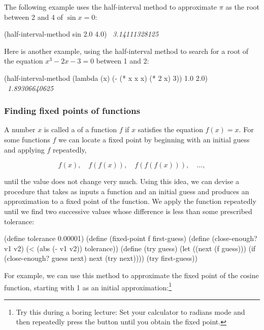 \noindent
The following example uses the half-interval method to approximate \( \pi \) as
the root between 2 and 4 of \( \sin x = 0 \):

\begin{codeBlock}
(half-interval-method sin 2.0 4.0)
~\textit{3.14111328125}~
\end{codeBlock}

\noindent
Here is another example, using the half-interval method to search for a root of
the equation \( x^3 - 2x - 3 = 0 \) between 1 and 2:

\begin{codeBlock}
(half-interval-method (lambda (x) (- (* x x x) (* 2 x) 3))
                      1.0
                      2.0)
~\textit{1.89306640625}~
\end{codeBlock}

\subsubsection*{Finding fixed points of functions}

A number \( x \) is called a  of a function \( f \) if \( x \)
satisfies the equation \( f(x) = x \).  For some functions \( f \) we can
locate a fixed point by beginning with an initial guess and applying \( f \)
repeatedly,

$$ f(x),\quad f(f(x)),\quad f(f(f(x))), \quad\dots, $$

\noindent
until the value does not change very much.  Using this idea, we can devise a
procedure  that takes as inputs a function and an initial
guess and produces an approximation to a fixed point of the function.  We apply
the function repeatedly until we find two successive values whose difference is
less than some prescribed tolerance:

\begin{codeBlock}
(define tolerance 0.00001)
(define (fixed-point f first-guess)
  (define (close-enough? v1 v2)
    (< (abs (- v1 v2))
       tolerance))
  (define (try guess)
    (let ((next (f guess)))
      (if (close-enough? guess next)
          next
          (try next))))
  (try first-guess))
\end{codeBlock}

\noindent
For example, we can use this method to approximate the fixed point of the
cosine function, starting with 1 as an initial approximation:\footnote{Try this
during a boring lecture: Set your calculator to radians mode and then
repeatedly press the  button until you obtain the fixed point.}

